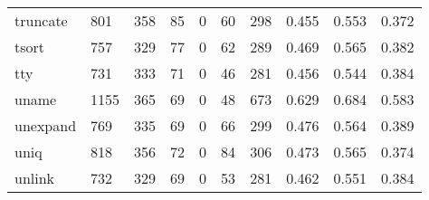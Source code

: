\begin{longtable}{lp{2.0cm}p{2.0cm}p{2.0cm}p{2.0cm}p{2.0cm}p{2.0cm}p{2.0cm}p{2.0cm}p{2.0cm}}
truncate  &                    801 &                                358 &                                85 &                                0 &                                60 &                             298 &                                0.455 &                                  0.553 &                                0.372 \\
tsort     &                    757 &                                329 &                                77 &                                0 &                                62 &                             289 &                                0.469 &                                  0.565 &                                0.382 \\
tty       &                    731 &                                333 &                                71 &                                0 &                                46 &                             281 &                                0.456 &                                  0.544 &                                0.384 \\
uname     &                   1155 &                                365 &                                69 &                                0 &                                48 &                             673 &                                0.629 &                                  0.684 &                                0.583 \\
unexpand  &                    769 &                                335 &                                69 &                                0 &                                66 &                             299 &                                0.476 &                                  0.564 &                                0.389 \\
uniq      &                    818 &                                356 &                                72 &                                0 &                                84 &                             306 &                                0.473 &                                  0.565 &                                0.374 \\
unlink    &                    732 &                                329 &                                69 &                                0 &                                53 &                             281 &                                0.462 &                                  0.551 &                                0.384 \\

\end{longtable}
